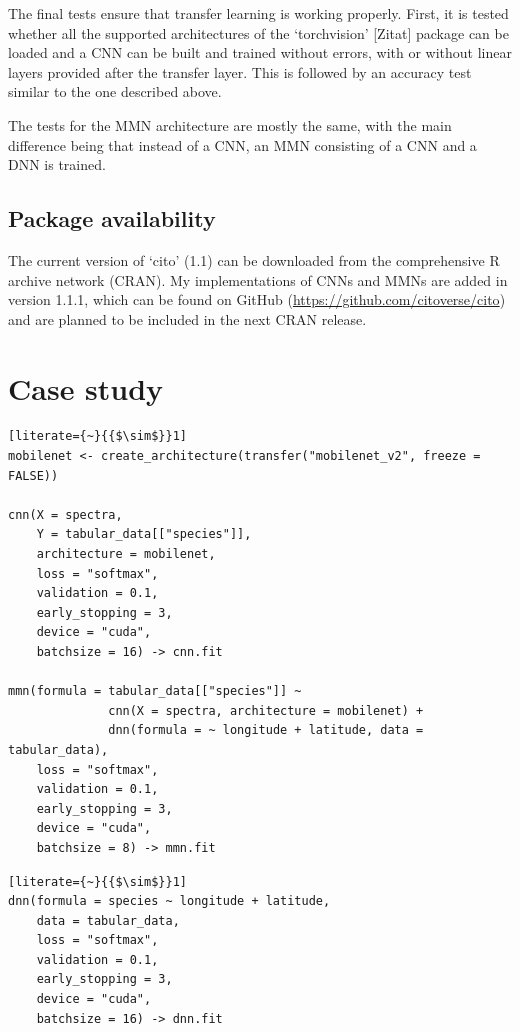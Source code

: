 \documentclass[12pt,twoside]{scrreport}
\newcommand{\pkg}[1]{`#1'}
\begin{document}
The final tests ensure that transfer learning is working properly. First, it is tested whether all the supported architectures of the \pkg{torchvision} [Zitat] package can be loaded and a CNN can be built and trained without errors, with or without linear layers provided after the transfer layer. This is followed by an accuracy test similar to the one described above.

The tests for the MMN architecture are mostly the same, with the main difference being that instead of a CNN, an MMN consisting of a CNN and a DNN is trained.

\section*{Package availability}
The current version of \pkg{cito} (1.1) can be downloaded from the comprehensive R archive network (CRAN). My implementations of CNNs and MMNs are added in version 1.1.1, which can be found on GitHub (\url{https://github.com/citoverse/cito}) and are planned to be included in the next CRAN release.

\chapter*{Case study}
\newsavebox{\cnn} %
\begin{lrbox}{\cnn}
	\begin{lstlisting}[literate={~}{{$\sim$}}1]
mobilenet <- create_architecture(transfer("mobilenet_v2", freeze = FALSE))

cnn(X = spectra,
    Y = tabular_data[["species"]],
    architecture = mobilenet,
    loss = "softmax",
    validation = 0.1,
    early_stopping = 3,
    device = "cuda",
    batchsize = 16) -> cnn.fit
		
mmn(formula = tabular_data[["species"]] ~ 
              cnn(X = spectra, architecture = mobilenet) +
              dnn(formula = ~ longitude + latitude, data = tabular_data),
    loss = "softmax",
    validation = 0.1,
    early_stopping = 3,
    device = "cuda",
    batchsize = 8) -> mmn.fit
	\end{lstlisting}
\end{lrbox}

\newsavebox{\dnn} %
\begin{lrbox}{\dnn}
	\begin{minipage}{\wd\cnn}
		\begin{lstlisting}[literate={~}{{$\sim$}}1]
dnn(formula = species ~ longitude + latitude,                             
    data = tabular_data,
    loss = "softmax",
    validation = 0.1,
    early_stopping = 3,
    device = "cuda",
    batchsize = 16) -> dnn.fit
		\end{lstlisting}
	\end{minipage}
\end{lrbox}
\end{document}
